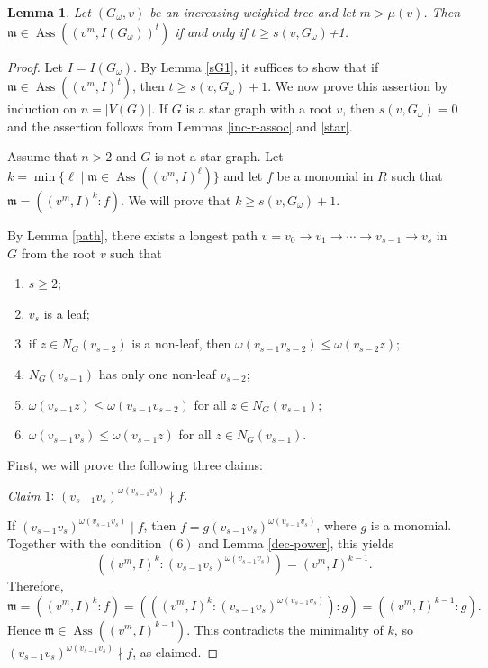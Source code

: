 \documentclass[12pt,amscd]{amsart}
\DeclareMathOperator{\ass}{Ass}
\newtheorem{lem}[thm]{Lemma}
\theoremstyle{definition}
\def\m {\mathfrak m}
\begin{document}
\begin{lem} \label{sG2} Let $(G_\omega,v)$ be an increasing weighted tree and let $m > \mu(v)$. Then $\m\in \ass((v^m,I(G_\omega))^t)$ if and only if $t\geqslant s(v,G_\omega)$+1.
\end{lem}
\begin{proof} Let $I=I(G_\omega)$. By Lemma \ref{sG1}, it suffices to show that if $\m\in\ass((v^m,I)^t)$, then $t\geqslant s(v,G_{\omega})+1$. 
 We now prove this assertion by induction on $n=|V(G)|$. 
 If  $G$ is a star graph with a root  $v$, then  $s(v,G_\omega)=0$ and the assertion follows from Lemmas \ref{inc-r-assoc} and  \ref{star}.
 
 Assume that $n > 2$ and $G$ is not a star graph. Let $k=\min\{\ell\mid \m\in \ass((v^m,I)^{\ell})\}$ and let $f$ be a monomial in $R$ such that $\m = ((v^m,I)^k \colon f)$. 
We will prove that $k\geqslant s(v,G_\omega)+1$.

By Lemma \ref{path},  there exists a longest path $v= v_0\to v_1\to\cdots\to v_{s-1}\to v_s$ in $G$ from the root $v$ such that 
\begin{enumerate}
	\item $s\geqslant 2$;
	\item $v_s$ is a leaf;
	\item if $z\in N_G(v_{s-2})$ is a non-leaf, then $\omega(v_{s-1}v_{s-2})\leqslant \omega(v_{s-2}z)$;
	\item $N_G(v_{s-1})$ has only one non-leaf $v_{s-2}$;
	\item $\omega(v_{s-1}z) \leqslant \omega(v_{s-1}v_{s-2})$ for all $z\in N_G(v_{s-1})$;
	\item $\omega(v_{s-1}v_s) \leqslant \omega(v_{s-1}z)$ for all $z\in N_G(v_{s-1})$.
\end{enumerate}
First, we will prove the following  three  claims:

{\it Claim $1$}: $(v_{s-1}v_{s})^{\omega(v_{s-1}v_{s})} \nmid f$. 

If $(v_{s-1}v_{s})^{\omega(v_{s-1}v_{s})} \mid f$, then $f = g(v_{s-1}v_{s})^{\omega(v_{s-1}v_{s})}$, where $g$ is a monomial. Together with the condition  $(6)$ and  Lemma \ref{dec-power},   this yields
\[
((v^m,I)^k \colon (v_{s-1}v_{s})^{\omega(v_{s-1}v_{s})}) = (v^m,I)^{k-1}.
\]
Therefore,
$$\m = ((v^m,I)^k \colon f) = (((v^m,I)^k\colon (v_{s-1}v_{s})^{\omega(v_{s-1}v_{s})})\colon g) = ((v^m,I)^{k-1}\colon g).$$
Hence $\m\in \ass((v^m,I)^{k-1})$. This contradicts the minimality of $k$, so  $(v_{s-1}v_{s})^{\omega(v_{s-1}v_{s})}\nmid f$, as claimed.



\end{proof}
\end{document}
